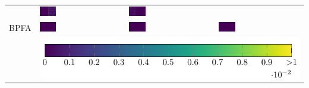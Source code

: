 \begin{tabular}{m{}*{3}{M{0.21\textwidth}}}
&\includegraphics[width=0.2\textwidth]{img/chapitre4/figure15/synth/Synth_wKSVD_matlab_band_1.png}
&\includegraphics[width=0.2\textwidth]{img/chapitre4/figure15/synth/Synth_wKSVD_matlab_band_2.png}
\\
BPFA
&\includegraphics[width=0.2\textwidth]{img/chapitre4/figure15/synth/Synth_BPFA_matlab_band_0.png}
&\includegraphics[width=0.2\textwidth]{img/chapitre4/figure15/synth/Synth_BPFA_matlab_band_1.png}
&\includegraphics[width=0.2\textwidth]{img/chapitre4/figure15/synth/Synth_BPFA_matlab_band_2.png}
\\
%
&\\
\end{tabular}
